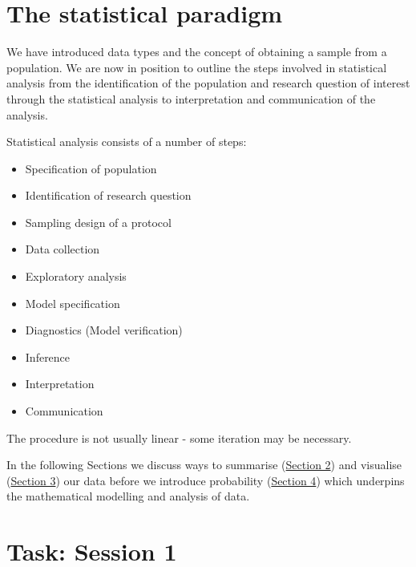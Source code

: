 \documentclass[
]{book}
\providecommand{\tightlist}{%
  \setlength{\itemsep}{0pt}\setlength{\parskip}{0pt}}
\begin{document}
\hypertarget{intro_paradigm}{%
\section{The statistical paradigm}\label{intro_paradigm}}

We have introduced data types and the concept of obtaining a sample from a population. We are now in position to outline the steps involved in statistical analysis from the identification of the population and research question of interest through the statistical analysis to interpretation and communication of the analysis.

Statistical analysis consists of a number of steps:

\begin{itemize}
\tightlist
\item
  Specification of population\\
\item
  Identification of research question\\
\item
  Sampling design of a protocol\\
\item
  Data collection\\
\item
  Exploratory analysis\\
\item
  Model specification\\
\item
  Diagnostics (Model verification)\\
\item
  Inference\\
\item
  Interpretation\\
\item
  Communication
\end{itemize}

The procedure is not usually linear - some iteration may be necessary.

In the following Sections we discuss ways to summarise (\protect\hyperlink{summary}{Section 2}) and visualise (\protect\hyperlink{visual}{Section 3}) our data before we introduce probability (\protect\hyperlink{prob}{Section 4}) which underpins the mathematical modelling and analysis of data.

\hypertarget{intro:R}{%
\section*{\texorpdfstring{{\textbf{Task: Session 1}}}{Task: Session 1}}\label{intro:R}}
\end{document}
